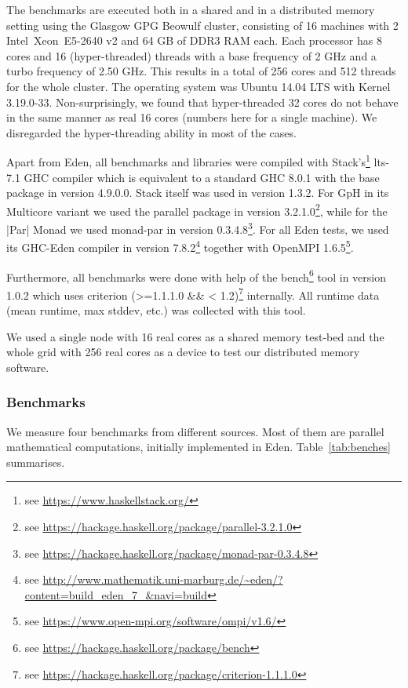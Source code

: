 The benchmarks are executed  both in a shared and in a distributed memory setting using the Glasgow GPG Beowulf cluster, consisting of
16 machines with 2 Intel\SymbReg~Xeon\SymbReg~E5-2640 v2 and 64 GB of DDR3 RAM each. Each processor has 8 cores and 16 (hyper-threaded) threads with a base frequency of 2 GHz and a turbo frequency of 2.50 GHz. This results in a total of 256 cores and 512 threads for the whole cluster. The operating system was Ubuntu 14.04 LTS with Kernel 3.19.0-33. Non-surprisingly, we found that hyper-threaded 32 cores do not behave in the same manner as real 16 cores (numbers here for a single machine). We disregarded the hyper-threading ability in most of the cases.

Apart from Eden, all benchmarks and libraries were compiled with Stack's\footnote{see \url{https://www.haskellstack.org/}} lts-7.1 GHC compiler which is equivalent to a standard GHC 8.0.1 with the base package in version 4.9.0.0. Stack itself was used in version 1.3.2. For GpH in its Multicore variant we used the parallel package in version 3.2.1.0\footnote{see \url{https://hackage.haskell.org/package/parallel-3.2.1.0}}, while for the |Par| Monad we used monad-par in version 0.3.4.8\footnote{see \url{https://hackage.haskell.org/package/monad-par-0.3.4.8}}. For all Eden tests, we used its GHC-Eden compiler in version 7.8.2\footnote{see \url{http://www.mathematik.uni-marburg.de/~eden/?content=build_eden_7_&navi=build}} together with OpenMPI 1.6.5\footnote{see \url{https://www.open-mpi.org/software/ompi/v1.6/}}.

Furthermore, all benchmarks were done with help of the bench\footnote{see \url{https://hackage.haskell.org/package/bench}} tool in version 1.0.2 which uses criterion (>=1.1.1.0 \&\& < 1.2)\footnote{see \url{https://hackage.haskell.org/package/criterion-1.1.1.0}} internally. All runtime data (mean runtime, max stddev, etc.) was collected with this tool.

We used a single node with 16 real cores as a shared memory test-bed
and the whole grid with 256 real cores as a device to test our
distributed memory software.

\subsubsection{Benchmarks}

We measure four benchmarks from different
sources. Most of them are parallel mathematical computations, initially
implemented in Eden. Table~\ref{tab:benches} summarises.

